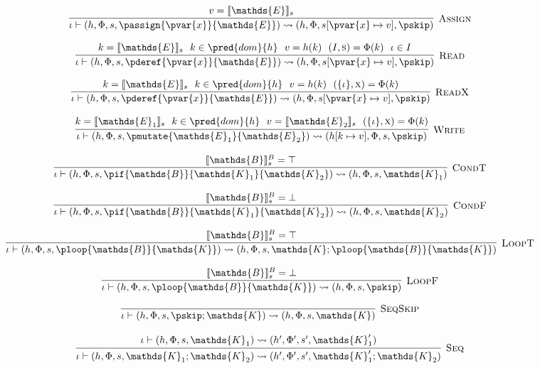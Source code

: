 \[
\infer[\textsc{Assign}]
{
	\iota \vdash (h, \Phi, s, \passign{\pvar{x}}{\mathds{E}})
	\rightsquigarrow
	(h, \Phi, s[\pvar{x} \mapsto v], \pskip)
}
{
	v = \llbracket \mathds{E} \rrbracket_s
}
\]

\[
\infer[\textsc{Read}]
{
	\iota \vdash (h, \Phi, s, \pderef{\pvar{x}}{\mathds{E}})
	\rightsquigarrow
	(h, \Phi, s[\pvar{x} \mapsto v], \pskip)
}
{
	k = \llbracket \mathds{E} \rrbracket_s\ \
	k \in \pred{dom}{h}\ \
	v = h(k)\ \
	(I, \textsc{s}) = \Phi(k)\ \
	\iota \in I
}
\]

\[
\infer[\textsc{ReadX}]
{
	\iota \vdash (h, \Phi, s, \pderef{\pvar{x}}{\mathds{E}})
	\rightsquigarrow
	(h, \Phi, s[\pvar{x} \mapsto v], \pskip)
}
{
	k = \llbracket \mathds{E} \rrbracket_s\ \
	k \in \pred{dom}{h}\ \
	v = h(k)\ \
	(\{\iota\}, \textsc{x}) = \Phi(k)
}
\]

\[
\infer[\textsc{Write}]
{
	\iota \vdash (h, \Phi, s, \pmutate{\mathds{E}_1}{\mathds{E}_2})
	\rightsquigarrow
	(h[k \mapsto v], \Phi, s, \pskip)
}
{
	k = \llbracket \mathds{E}_1 \rrbracket_s\ \
	k \in \pred{dom}{h}\ \
	v = \llbracket \mathds{E}_2 \rrbracket_s\ \
	(\{ \iota \}, \textsc{x}) = \Phi(k)
}
\]

\[
\infer[\textsc{CondT}]
{
	\iota \vdash (h, \Phi, s, \pif{\mathds{B}}{\mathds{K}_1}{\mathds{K}_2})
	\rightsquigarrow
	(h, \Phi, s, \mathds{K}_1)
}
{
	\llbracket \mathds{B} \rrbracket_s^B = \top
}
\]

\[
\infer[\textsc{CondF}]
{
	\iota \vdash (h, \Phi, s, \pif{\mathds{B}}{\mathds{K}_1}{\mathds{K}_2})
	\rightsquigarrow
	(h, \Phi, s, \mathds{K}_2)
}
{
	\llbracket \mathds{B} \rrbracket_s^B = \bot
}
\]

\[
\infer[\textsc{LoopT}]
{
	\iota \vdash (h, \Phi, s, \ploop{\mathds{B}}{\mathds{K}})
	\rightsquigarrow
	(h, \Phi, s, \mathds{K}; \ploop{\mathds{B}}{\mathds{K}})
}
{
	\llbracket \mathds{B} \rrbracket_s^B = \top
}
\]

\[
\infer[\textsc{LoopF}]
{
	\iota \vdash (h, \Phi, s, \ploop{\mathds{B}}{\mathds{K}})
	\rightsquigarrow
	(h, \Phi, s, \pskip)
}
{
	\llbracket \mathds{B} \rrbracket_s^B = \bot
}
\]

\[
\infer[\textsc{SeqSkip}]
{
	\iota \vdash (h, \Phi, s, \pskip ; \mathds{K})
	\rightsquigarrow
	(h, \Phi, s, \mathds{K})
}
{}
\]

\[
\infer[\textsc{Seq}]
{
	\iota \vdash (h, \Phi, s, \mathds{K}_1 ; \mathds{K}_2)
	\rightsquigarrow
	(h', \Phi', s', \mathds{K}_1' ; \mathds{K}_2)
}
{
	\iota \vdash (h, \Phi, s, \mathds{K}_1)
	\rightsquigarrow
	(h', \Phi', s', \mathds{K}_1')
}
\]

